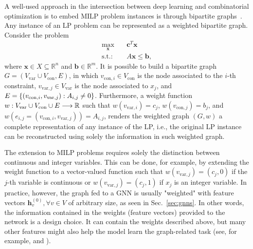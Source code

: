 A well-used approach in the intersection between deep learning and combinatorial optimization is to embed MILP problem instances is through bipartite graphs~\cite{gasseExactCombinatorialOptimization2019,nairSolvingMixedInteger2021,dingAcceleratingPrimalSolution2020,khalilMIPGNNDataDrivenFramework2022,hanGNNGuidedPredictandSearchFramework2023}.
Any instance of an LP problem can be represented as a weighted bipartite graph.
Consider the problem
\begin{equation}\label{eq:example-lp-graph}
\begin{aligned}
    \max_{\bm{x}} & \quad \bm{c}^T \bm{x} \\
    \text{s.t.:} & \quad A\bm{x} \le\bm{b} 
,\end{aligned}
\end{equation}
where $\bm{x}\in X \subseteq\mathbb{R}^n$ and $\bm{b}\in \mathbb{R}^m$.
It is possible to build a bipartite graph $G=(V_{\textrm{var}}\cup V_{\textrm{con}}, E)$, in which $v_{\textrm{con},i}\in V_{\textrm{con}}$ is the node associated to the $i$-th constraint, $v_{\textrm{var},j}\in V_{\textrm{var}}$ is the node associated to $x_j$, and $E=\{(v_{{\rm con},i},v_{{\rm var},j}) : A_{i,j} \neq 0\}$.
Furthermore, a weight function $w: V_{\textrm{var}}\cup V_\textrm{con}\cup E \longrightarrow \mathbb{R}$ such that $w(v_{\textrm{var},i}) = c_j$, $w(v_{\textrm{con},j}) = b_j$, and $w(e_{i,j}=(v_{\textrm{con},i},v_{\textrm{var},j})) = A_{i,j}$, renders the weighted graph $(G,w)$ a complete representation of any instance of the LP, i.e., the original LP instance can be reconstructed using solely the information in such weighted graph.

The extension to MILP problems requires solely the distinction between continuous and integer variables.
This can be done, for example, by extending the weight function to a vector-valued function such that $w(v_{\textrm{var},j}) = (c_j,0)$ if the $j$-th variable is continuous or $w(v_{\textrm{var},j}) = (c_j,1)$ if $x_j$ is an integer variable.
In practice, however, the graph fed to a GNN is usually "weighted" with feature vectors $\bm{h}_v^{(0)}, \forall v\in V$ of arbitrary size, as seen in Sec.~\ref{sec:gnns}.
In other words, the information contained in the weights (feature vectors) provided to the network is a design choice.
It can contain the weights described above, but many other features might also help the model learn the graph-related task (see, for example,  and ).

